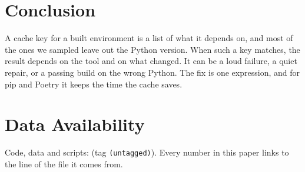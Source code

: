 \documentclass[10pt,a4paper]{article}
\newcommand{\repotag}{(untagged)}}
\begin{document}
\section{Conclusion}

A cache key for a built environment is a list of what it depends on, and most
of the ones we sampled leave out the Python version. When such a key matches,
the result depends on the tool and on what changed. It can be a loud failure,
a quiet repair, or a passing build on the wrong Python. The fix is one
expression, and for pip and Poetry it keeps the time the cache saves.

\section*{Data Availability}
Code, data and scripts: \repourl{} (tag \texttt{\repotag}). Every number in
this paper links to the line of the file it comes from.



\end{document}
